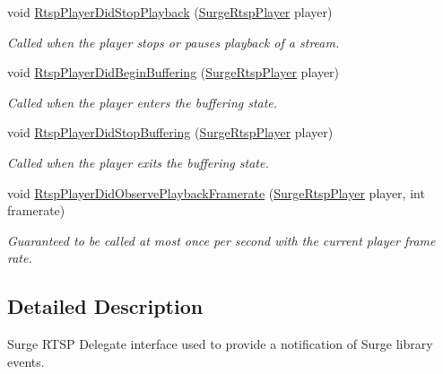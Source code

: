 \begin{DoxyCompactItemize}
void \hyperlink{interface_surge_xamarini_o_s_bindings_1_1_surge_rtsp_player_delegate_acbda4e7146444810d2800ad8e6a90d88}{Rtsp\+Player\+Did\+Stop\+Playback} (\hyperlink{interface_surge_xamarini_o_s_bindings_1_1_surge_rtsp_player}{Surge\+Rtsp\+Player} player)
\begin{DoxyCompactList}\small\item\em Called when the player stops or pauses playback of a stream. \end{DoxyCompactList}\item 
void \hyperlink{interface_surge_xamarini_o_s_bindings_1_1_surge_rtsp_player_delegate_a60aaf86b1f006e37c387d6dbe710977f}{Rtsp\+Player\+Did\+Begin\+Buffering} (\hyperlink{interface_surge_xamarini_o_s_bindings_1_1_surge_rtsp_player}{Surge\+Rtsp\+Player} player)
\begin{DoxyCompactList}\small\item\em Called when the player enters the buffering state. \end{DoxyCompactList}\item 
void \hyperlink{interface_surge_xamarini_o_s_bindings_1_1_surge_rtsp_player_delegate_ac178f502817c60bfe3a57b7393d66232}{Rtsp\+Player\+Did\+Stop\+Buffering} (\hyperlink{interface_surge_xamarini_o_s_bindings_1_1_surge_rtsp_player}{Surge\+Rtsp\+Player} player)
\begin{DoxyCompactList}\small\item\em Called when the player exits the buffering state. \end{DoxyCompactList}\item 
void \hyperlink{interface_surge_xamarini_o_s_bindings_1_1_surge_rtsp_player_delegate_a96ebb6b82e20ba68d1b91bee632efd06}{Rtsp\+Player\+Did\+Observe\+Playback\+Framerate} (\hyperlink{interface_surge_xamarini_o_s_bindings_1_1_surge_rtsp_player}{Surge\+Rtsp\+Player} player, int framerate)
\begin{DoxyCompactList}\small\item\em Guaranteed to be called at most once per second with the current player frame rate. \end{DoxyCompactList}\end{DoxyCompactItemize}


\subsection{Detailed Description}
Surge R\+T\+SP Delegate interface used to provide a notification of Surge library events. 



